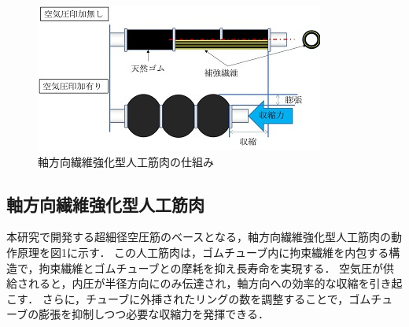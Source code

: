   \begin{figure}[!b]
    \centering  %
    \includegraphics[scale=0.7]{pic/A.PNG}
    \caption{軸方向繊維強化型人工筋肉の仕組み\cite{4}}
  \end{figure}
  
\subsection{軸方向繊維強化型人工筋肉}
本研究で開発する超細径空圧筋のベースとなる，軸方向繊維強化型人工筋肉の動作原理を図1に示す．
この人工筋肉は，ゴムチューブ内に拘束繊維を内包する構造で，拘束繊維とゴムチューブとの摩耗を抑え長寿命を実現する．
空気圧が供給されると，内圧が半径方向にのみ伝達され，軸方向への効率的な収縮を引き起こす．
さらに，チューブに外挿されたリングの数を調整することで，ゴムチューブの膨張を抑制しつつ必要な収縮力を発揮できる\cite{3}．

